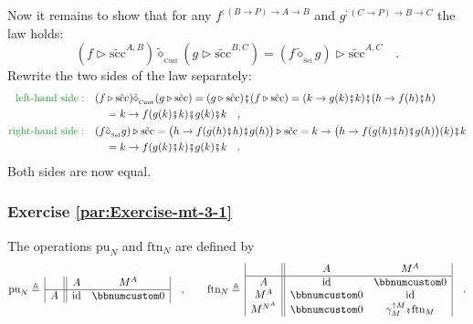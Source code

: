 Now it remains to show that for any $f^{:\left(B\rightarrow P\right)\rightarrow A\rightarrow B}$
and $g^{:\left(C\rightarrow P\right)\rightarrow B\rightarrow C}$
the law holds:
\[
(f\triangleright\tilde{\text{scc}}^{A,B})\tilde{\diamond}_{_{\text{Cont}}}(g\triangleright\tilde{\text{scc}}^{B,C})=(f\tilde{\diamond}_{_{\text{Sel}}}g)\triangleright\tilde{\text{scc}}^{A,C}\quad.
\]
Rewrite the two sides of the law separately:
\begin{align*}
{\color{greenunder}\text{left-hand side}:}\quad & (f\triangleright\tilde{\text{scc}})\tilde{\diamond}_{_{\text{Cont}}}(g\triangleright\tilde{\text{scc}})=(g\triangleright\tilde{\text{scc}})\bef(f\triangleright\tilde{\text{scc}})=(k\rightarrow g(k)\bef k)\bef(h\rightarrow f(h)\bef h)\\
 & \quad=k\rightarrow f(g(k)\bef k)\bef g(k)\bef k\quad,\\
{\color{greenunder}\text{right-hand side}:}\quad & (f\tilde{\diamond}_{_{\text{Sel}}}g)\triangleright\tilde{\text{scc}}=\big(h\rightarrow f(g(h)\bef h)\bef g(h)\big)\triangleright\tilde{\text{scc}}=k\rightarrow\big(h\rightarrow f(g(h)\bef h)\bef g(h)\big)(k)\bef k\\
 & \quad=k\rightarrow f(g(k)\bef k)\bef g(k)\bef k\quad.
\end{align*}
Both sides are now equal.

\subsubsection*{Exercise \ref{par:Exercise-mt-3-1}}

The operations $\text{pu}_{N}$ and $\text{ftn}_{N}$ are defined
by
\[
\text{pu}_{N}\triangleq\,\begin{array}{|c||cc|}
 & A & M^{A}\\
\hline A & \text{id} & \bbnum 0
\end{array}\quad,\quad\quad\text{ftn}_{N}\triangleq\,\begin{array}{|c||cc|}
 & A & M^{A}\\
\hline A & \text{id} & \bbnum 0\\
M^{A} & \bbnum 0 & \text{id}\\
M^{N^{A}} & \bbnum 0 & \gamma_{M}^{\uparrow M}\bef\text{ftn}_{M}
\end{array}\quad.
\]

